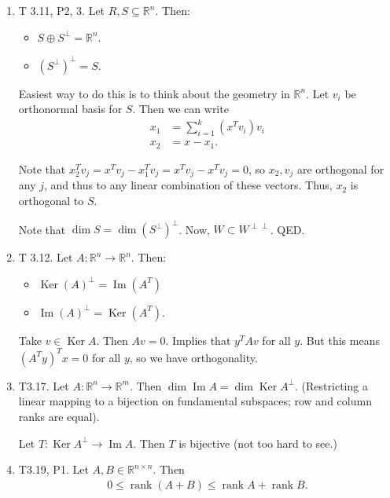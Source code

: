 \documentclass{article}
\newcommand{\RR}{\mathbb{R}}
\DeclareMathOperator{\Ker}{Ker}
\DeclareMathOperator{\Ima}{Im}
\DeclareMathOperator{\Ima}{Im}
\DeclareMathOperator{\rank}{rank}
\begin{document}
\begin{enumerate}
    \item  T 3.11, P2, 3. Let $R, S \subseteq \RR^n$.  Then:

      \begin{itemize}
        \item $S \oplus S^{\perp} = \RR^n$.
        \item $(S^{\perp})^{\perp} = S$.
      \end{itemize}

      Easiest way to do this is to think about the geometry in $\RR^n$.  Let $v_i$ be orthonormal basis for $S$.  Then we can write
      \begin{align*}
        x_1 &= \sum_{i=1}^{k} (x^T v_i) v_i \\
        x_2 &= x - x_1.
      \end{align*}

      Note that $x_2^T v_j =  x^T v_j - x_1^T v_j = x^T v_j - x^T v_j = 0$, so $x_2, v_j$ are orthogonal for any $j$, and thus to any linear combination of these vectors.  Thus, $x_2$ is orthogonal to $S$.

     Note that $\dim S = \dim (S^{\perp})^{\perp}$.  Now, $W \subset W^{\perp \perp}$.  QED.

    \item T 3.12. Let $A: \RR^n \to \RR^n$.  Then:

      \begin{itemize}
        \item $\Ker(A)^{\perp} = \Ima (A^T)$
        \item $\Ima (A)^{\perp} = \Ker (A^T)$.
      \end{itemize}

      Take $v \in \Ker A$.  Then $Av = 0$.  Implies that $y^T A v$ for all $y$.  But this means $(A^T y)^T x = 0$ for all $y$, so we have orthogonality.

    \item T3.17. Let $A: \RR^n \to \RR^m$. Then $\dim \Ima A = \dim \Ker A^{\perp}$. (Restricting a linear mapping to a bijection on fundamental subspaces; row and column ranks are equal).

      Let $T: \Ker A^{\perp} \to \Ima A$.  Then $T$ is bijective (not too hard to see.)

    \item T3.19, P1. Let $A, B \in \RR^{n \times n}$.  Then
      \begin{align*}
        0 \leq \rank (A+B) \leq \rank A + \rank B.
      \end{align*}


\end{enumerate}
\end{document}
